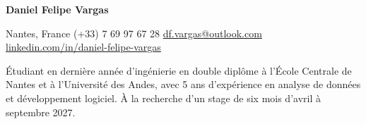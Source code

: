 \begin{center}

  {\Huge\bfseries Daniel Felipe Vargas}

  \vspace{12pt}

  Nantes, France\dotsep%
  (+33) 7 69 97 67 28\dotsep%
  \href{mailto:df.vargas@outlook.com}{df.vargas@outlook.com}\dotsep%
  \href{https://www.linkedin.com/in/daniel-felipe-vargas/}{linkedin.com/in/daniel-felipe-vargas}

\end{center}

{\justifying\parfillskip=0pt\small

  \noindent Étudiant en dernière année d'ingénierie en double diplôme à l'École Centrale de Nantes et à l'Université des Andes, avec 5 ans d'expérience en analyse de données et développement logiciel. À la recherche d'un stage de six mois d'avril à septembre 2027.
\par}